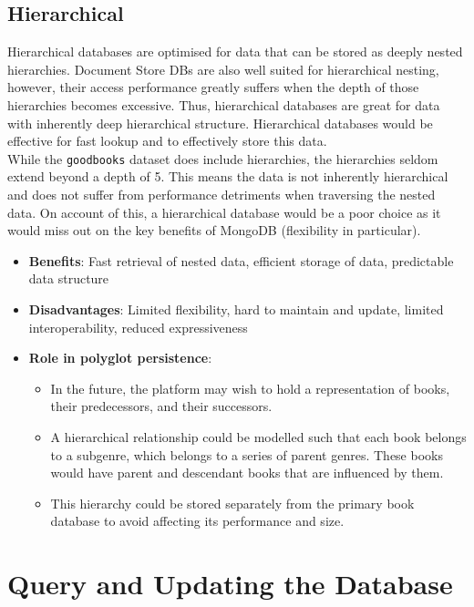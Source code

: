 \documentclass[11pt]{article}
\begin{document}
\subsection{Hierarchical}
\label{sec:orgcc6b674}
Hierarchical databases are optimised for data that can be stored as deeply nested hierarchies. Document Store DBs are also well suited for hierarchical nesting, however, their access performance greatly suffers when the depth of those hierarchies becomes excessive. Thus, hierarchical databases are great for data with inherently deep hierarchical structure. Hierarchical databases would be effective for fast lookup and to effectively store this data.\\
\linebreak
While the \texttt{goodbooks} dataset does include hierarchies, the hierarchies seldom extend beyond a depth of 5. This means the data is not inherently hierarchical and does not suffer from performance detriments when traversing the nested data. On account of this, a hierarchical database would be a poor choice as it would miss out on the key benefits of MongoDB (flexibility in particular).

\begin{itemize}
\item \textbf{Benefits}: Fast retrieval of nested data, efficient storage of data, predictable data structure
\item \textbf{Disadvantages}: Limited flexibility, hard to maintain and update, limited interoperability, reduced expressiveness
\item \textbf{Role in polyglot persistence}:
\begin{itemize}
\item In the future, the platform may wish to hold a representation of books, their predecessors, and their successors.
\item A hierarchical relationship could be modelled such that each book belongs to a subgenre, which belongs to a series of parent genres. These books would have parent and descendant books that are influenced by them.
\item This hierarchy could be stored separately from the primary book database to avoid affecting its performance and size.
\end{itemize}
\end{itemize}
\section{Query and Updating the Database}
\label{sec:org1de6e3b}
\end{document}
